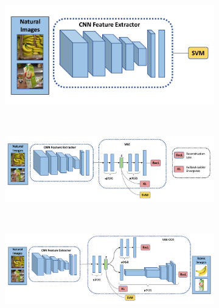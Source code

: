\begin{figure}[t]
	\centering
	\begin{subfigure}[b]{0.35\textwidth}
		\centering
		\includegraphics[width=\textwidth]{PaperA/figures/cnn.pdf}
		\caption{}
		\label{subfig:cnn}
	\end{subfigure} ~
	\begin{subfigure}[b]{0.6\textwidth}
		\centering
		\includegraphics[width=\textwidth]{PaperA/figures/cnn+vae.pdf}
		\caption{}
		\label{subfig:cnn+vae}
	\end{subfigure} \\
	\begin{subfigure}[b]{0.7\textwidth}
		\centering
		\includegraphics[width=\textwidth]{PaperA/figures/vae-cca.pdf}
		\caption{}
		\label{subfig:vae-cca}
	\end{subfigure}

\end{figure}
